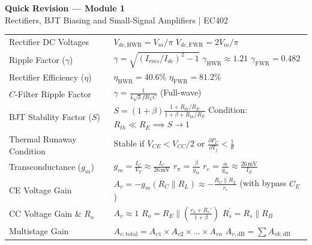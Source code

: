 \documentclass[12pt,a4paper]{article}
\renewcommand{\arraystretch}{1.45}
\begin{document}
\newpage

\begin{center}
  {\large\bfseries\color{myred} Quick Revision --- Module 1}\\[3pt]
  {\small\color{mydark} Rectifiers, BJT Biasing and Small-Signal Amplifiers $|$ EC402}
\end{center}
\noindent{\color{myred}\rule{\linewidth}{1.2pt}}
\vspace{4pt}

\begin{tcolorbox}[formulabox, title={Key Formulas at a Glance}]
\small
\renewcommand{\arraystretch}{1.35}
\setlength{\tabcolsep}{5pt}
\noindent\begin{tabularx}{\linewidth}{B{4.1cm}Y}
Rectifier DC Voltages & $V_{dc,\mathrm{HWR}} = V_m/\pi$ \newline $V_{dc,\mathrm{FWR}} = 2V_m/\pi$ \\[3pt]
Ripple Factor ($\gamma$) & $\gamma = \sqrt{(I_{rms}/I_{dc})^2 - 1}$ \newline $\gamma_{\mathrm{HWR}} \approx 1.21$ \newline $\gamma_{\mathrm{FWR}} = 0.482$ \\[3pt]
Rectifier Efficiency ($\eta$) & $\eta_{\mathrm{HWR}} = 40.6\%$ \newline $\eta_{\mathrm{FWR}} = 81.2\%$ \\[3pt]
$C$-Filter Ripple Factor & $\gamma = \frac{1}{4\sqrt{3} f R_L C}$ (Full-wave) \\[3pt]
BJT Stability Factor ($S$) & $S = (1+\beta)\frac{1 + R_{th}/R_E}{1+\beta + R_{th}/R_E}$ \newline Condition: $R_{th} \ll R_E \implies S \to 1$ \\[3pt]
Thermal Runaway Condition & Stable if $V_{CE} < V_{CC}/2$ or $\frac{\partial P_C}{\partial T_j} < \frac{1}{\theta}$ \\[3pt]
Transconductance ($g_m$) & $g_m = \frac{I_C}{V_T} \approx \frac{I_C}{26\,\mathrm{mV}}$ \newline $r_\pi = \frac{\beta}{g_m}$ \newline $r_e = \frac{\alpha}{g_m} \approx \frac{26\,\mathrm{mV}}{I_E}$ \\[3pt]
CE Voltage Gain & $A_v = -g_m (R_C \parallel R_L) \approx -\frac{R_C \parallel R_L}{r_e}$ (with bypass $C_E$) \\[3pt]
CC Voltage Gain \& $R_o$ & $A_v \approx 1$ \newline $R_o = R_E \parallel \left(\frac{r_\pi + R_s'}{1+\beta}\right)$ \newline $R_s^\prime = R_s \parallel R_B$ \\[3pt]
Multistage Gain & $A_{v,\mathrm{total}} = A_{v1} \times A_{v2} \times \dots \times A_{vn}$ \newline $A_{v,\mathrm{dB}} = \sum A_{vk,\mathrm{dB}}$
\end{tabularx}\par
\end{tcolorbox}
\end{document}
